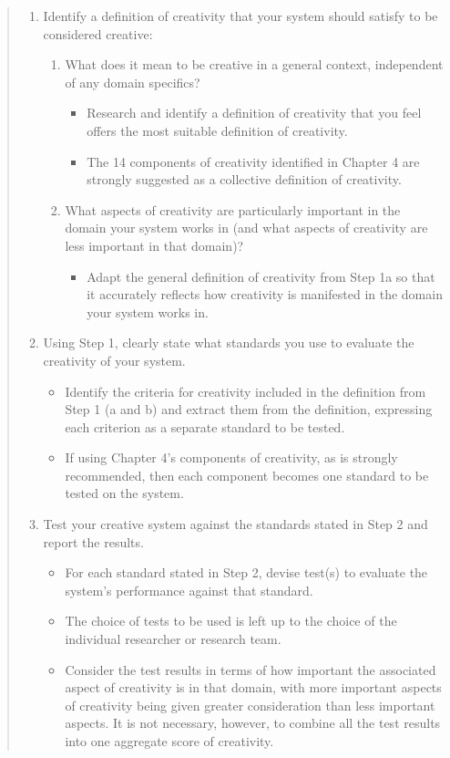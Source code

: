 \begin{quotation}
  \begin{enumerate}
    \item Identify a definition of creativity that your system should satisfy to be considered creative:
      \begin{enumerate}
        \item What does it mean to be creative in a general context, independent of any domain specifics?
        \begin{itemize}
          \item Research and identify a definition of creativity that you feel offers the most suitable definition of creativity.
          \item The 14 components of creativity identified in Chapter 4 are strongly suggested as a collective definition of creativity.
        \end{itemize}
        \item What aspects of creativity are particularly important in the domain your system works in (and what aspects of creativity are less important in that domain)?
        \begin{itemize}
          \item Adapt the general definition of creativity from Step 1a so that it accurately reflects how creativity is manifested in the domain your system works in.
        \end{itemize}
      \end{enumerate}
    \item Using Step 1, clearly state what standards you use to evaluate the creativity of your system.
      \begin{itemize}
        \item Identify the criteria for creativity included in the definition from Step 1 (a and b) and extract them from the definition, expressing each criterion as a separate standard to be tested.
        \item If using Chapter 4’s components of creativity, as is strongly recommended, then each component becomes one standard to be tested on the system.
      \end{itemize}
    \item Test your creative system against the standards stated in Step 2 and report the results.
      \begin{itemize}
        \item For each standard stated in Step 2, devise test(s) to evaluate the system’s performance against that standard.
        \item The choice of tests to be used is left up to the choice of the individual researcher or research team.
        \item Consider the test results in terms of how important the associated aspect of creativity is in that domain, with more important aspects of creativity being given greater consideration than less important aspects. It is not necessary, however, to combine all the test results into one aggregate score of creativity.
      \end{itemize}
  \end{enumerate}
\end{quotation}

